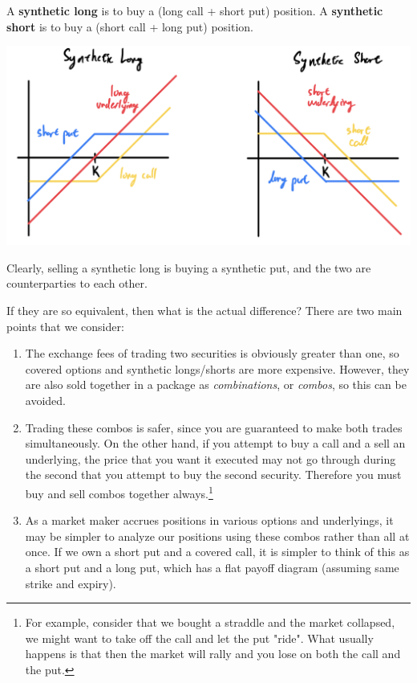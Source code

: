 \documentclass{article}
\begin{document}
    \begin{definition}
      A \textbf{synthetic long} is to buy a (long call + short put) position. A \textbf{synthetic short} is to buy a (short call + long put) position. 
      \begin{center} 
        \includegraphics[scale=0.3]{img/synthetic_long_short.png}
      \end{center}
      Clearly, selling a synthetic long is buying a synthetic put, and the two are counterparties to each other. 
    \end{definition}

    If they are so equivalent, then what is the actual difference? There are two main points that we consider: 
    \begin{enumerate}
      \item The exchange fees of trading two securities is obviously greater than one, so covered options and synthetic longs/shorts are more expensive. However, they are also sold together in a package as \textit{combinations}, or \textit{combos}, so this can be avoided. 
      \item Trading these combos is safer, since you are guaranteed to make both trades simultaneously. On the other hand, if you attempt to buy a call and a sell an underlying, the price that you want it executed may not go through during the second that you attempt to buy the second security. Therefore you must buy and sell combos together always.\footnote{For example, consider that we bought a straddle and the market collapsed, we might want to take off the call and let the put "ride". What usually happens is that then the market will rally and you lose on both the call and the put. }
      \item As a market maker accrues positions in various options and underlyings, it may be simpler to analyze our positions using these combos rather than all at once. If we own a short put and a covered call, it is simpler to think of this as a short put and a long put, which has a flat payoff diagram (assuming same strike and expiry). 
    \end{enumerate}
\end{document}
